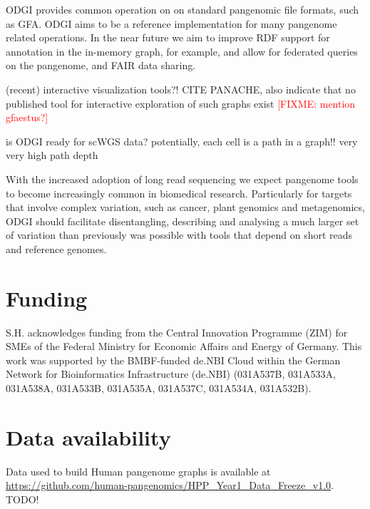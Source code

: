 \documentclass{bioinfo}
\newcommand{\red}[1]{{\textcolor{Red}{#1}}}
\newcommand{\FIXME}[1]{\red{[FIXME: #1]}}
\begin{document}
ODGI provides common operation on on standard pangenomic file formats, such as GFA. ODGI aims to be a reference implementation for many pangenome related operations. In the near future we aim to improve RDF support for annotation in the in-memory graph\cite{Yokoyama2020}, for example, and allow for federated queries on the pangenome, and FAIR data sharing.

(recent) interactive visualization tools?! CITE PANACHE, also indicate that no published tool for interactive exploration of such graphs exist
\FIXME{mention gfaestus?}

is ODGI ready for scWGS data? potentially, each cell is a path in a graph!! very very high path depth

With the increased adoption of long read sequencing we expect pangenome tools to become increasingly common in biomedical research. Particularly for targets that involve complex variation, such as cancer, plant genomics and metagenomics, ODGI should facilitate disentangling, describing and analysing a much larger set of variation than previously was possible with tools that depend on short reads and reference genomes.

\section*{Funding}

S.H. acknowledges funding from the Central Innovation Programme (ZIM) for SMEs of the Federal Ministry for Economic Affairs and Energy of Germany.
This work was supported by the BMBF-funded de.NBI Cloud within the German Network for Bioinformatics Infrastructure (de.NBI) (031A537B, 031A533A, 031A538A, 031A533B, 031A535A, 031A537C, 031A534A, 031A532B).

\section*{Data availability}

Data used to build Human pangenome graphs is available at \url{https://github.com/human-pangenomics/HPP_Year1_Data_Freeze_v1.0}.
TODO!


%
%
%
%
%
%
%




\end{document}
